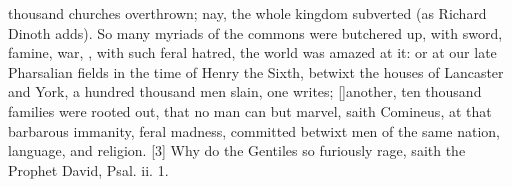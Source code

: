 {thousand churches overthrown; nay, the whole kingdom subverted (as
Richard Dinoth adds). So many myriads of the commons were
butchered up, with sword, famine, war, , with such feral hatred, the
world was amazed at it: or at our late Pharsalian fields in the time of
Henry the Sixth, betwixt the houses of Lancaster and York, a hundred
thousand men slain, one writes; [\baselineskip]another, ten thousand
families were rooted out, that no man can but marvel, saith Comineus,
at that barbarous immanity, feral madness, committed betwixt men of the
same nation, language, and religion. [3\baselineskip] Why do
the Gentiles so furiously rage, saith the Prophet David, Psal. ii. 1.

}
